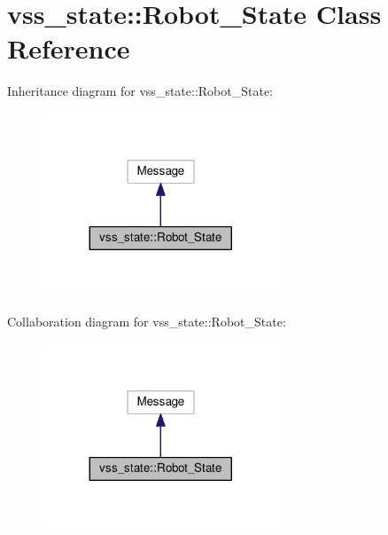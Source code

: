 \hypertarget{classvss__state_1_1Robot__State}{}\section{vss\+\_\+state\+:\+:Robot\+\_\+\+State Class Reference}
\label{classvss__state_1_1Robot__State}


Inheritance diagram for vss\+\_\+state\+:\+:Robot\+\_\+\+State\+:
\nopagebreak
\begin{figure}[H]
\begin{center}
\leavevmode
\includegraphics[width=200pt]{classvss__state_1_1Robot__State__inherit__graph}
\end{center}
\end{figure}


Collaboration diagram for vss\+\_\+state\+:\+:Robot\+\_\+\+State\+:
\nopagebreak
\begin{figure}[H]
\begin{center}
\leavevmode
\includegraphics[width=200pt]{classvss__state_1_1Robot__State__coll__graph}
\end{center}
\end{figure}
